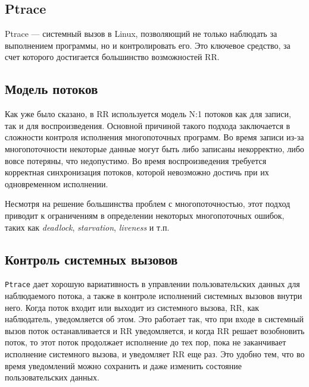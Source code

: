 
\subsection{Ptrace}

Ptrace — системный вызов в Linux, позволяющий не только наблюдать за выполнением программы, 
но и контролировать его. Это ключевое средство, за счет которого 
достигается большинство возможностей RR.

\subsection{Модель потоков}

Как уже было сказано, в RR используется модель N:1 потоков как для записи, 
так и для воспроизведения. Основной причиной такого подхода заключается в сложности 
контроля исполнения многопоточных программ. Во время записи из-за многопоточности некоторые данные могут быть либо записаны некорректно, 
либо вовсе потеряны, что недопустимо. Во время воспроизведения требуется корректная синхронизация потоков, 
которой невозможно достичь при их одновременном исполнении.

Несмотря на решение большинства проблем с многопоточностью, этот подход приводит к ограничениям в определении 
некоторых многопоточных ошибок, таких как \textit{deadlock}, \textit{starvation}, \textit{liveness} и т.п.

\subsection{Контроль системных вызовов}

\texttt{Ptrace} дает хорошую вариативность в управлении пользовательских данных для наблюдаемого потока, а также в контроле исполнений 
системных вызовов внутри него. Когда поток входит или выходит из системного вызова, RR, как наблюдатель, уведомляется об этом. 
Это работает так, что при входе в системный вызов поток останавливается и RR уведомляется, и когда RR решает возобновить поток, 
то этот поток продолжает исполнение до тех пор, пока не заканчивает исполнение системного вызова, и уведомляет RR еще раз. 
Это удобно тем, что во время уведомлений можно сохранить и даже изменить состояние пользовательских данных.

